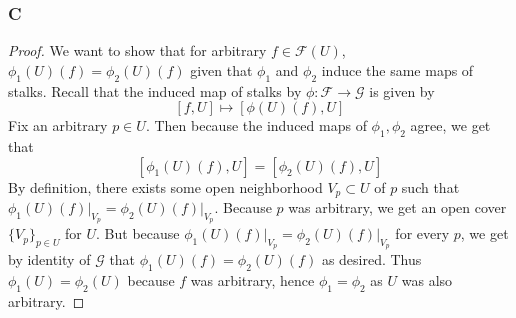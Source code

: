 \documentclass{article}
\newcommand{\fF}{\mathscr{F}}
\newcommand{\fG}{\mathscr{G}}
\begin{document}
\subsubsection{C}\label{2.4.C}
\begin{proof}
    We want to show that for arbitrary $f\in \fF(U)$, $\phi_1(U)(f)=\phi_2(U)(f)$ given that $\phi_1$ and $\phi_2$ induce the same maps of stalks. Recall that the induced map of stalks by $\phi:\fF\to \fG$ is given by
    \[
    [f,U]\mapsto [\phi(U)(f),U]
    \]
    Fix an arbitrary $p\in U$. Then because the induced maps of $\phi_1,\phi_2$ agree, we get that
    \[
    [\phi_1(U)(f),U]=[\phi_2(U)(f),U]
    \]
    By definition, there exists some open neighborhood $V_p \subset U$ of $p$ such that $\phi_1(U)(f)\vert_{V_p}=\phi_2(U)(f)\vert_{V_p}$. Because $p$ was arbitrary, we get an open cover $\{V_p\}_{p\in U}$ for $U$. But because $\phi_1(U)(f)\vert_{V_p}=\phi_2(U)(f)\vert_{V_p}$ for every $p$, we get by identity of $\fG$ that $\phi_1(U)(f)=\phi_2(U)(f)$ as desired. Thus $\phi_1(U)=\phi_2(U)$ because $f$ was arbitrary, hence $\phi_1=\phi_2$ as $U$ was also arbitrary.
\end{proof}
\end{document}

